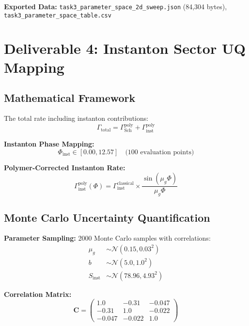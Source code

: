 \documentclass[11pt]{article}
\begin{document}
\textbf{Exported Data:} \texttt{task3\_parameter\_space\_2d\_sweep.json} (84,304 bytes), \texttt{task3\_parameter\_space\_table.csv}

\section{Deliverable 4: Instanton Sector UQ Mapping}

\subsection{Mathematical Framework}

The total rate including instanton contributions:
\begin{equation}
\boxed{\Gamma_{\text{total}} = \Gamma_{\text{Sch}}^{\text{poly}} + \Gamma_{\text{inst}}^{\text{poly}}}
\end{equation}

\textbf{Instanton Phase Mapping:}
\begin{equation}
\Phi_{\text{inst}} \in [0.00, 12.57] \quad \text{(100 evaluation points)}
\end{equation}

\textbf{Polymer-Corrected Instanton Rate:}
\begin{equation}
\Gamma_{\text{inst}}^{\text{poly}}(\Phi) = \Gamma_{\text{inst}}^{\text{classical}} \times \frac{\sin(\mu_g \Phi)}{\mu_g \Phi}
\end{equation}

\subsection{Monte Carlo Uncertainty Quantification}

\textbf{Parameter Sampling:} 2000 Monte Carlo samples with correlations:
\begin{align}
\mu_g &\sim \mathcal{N}(0.15, 0.03^2) \\
b &\sim \mathcal{N}(5.0, 1.0^2) \\
S_{\text{inst}} &\sim \mathcal{N}(78.96, 4.93^2)
\end{align}

\textbf{Correlation Matrix:}
\begin{equation}
\mathbf{C} = \begin{pmatrix}
1.0 & -0.31 & -0.047 \\
-0.31 & 1.0 & -0.022 \\
-0.047 & -0.022 & 1.0
\end{pmatrix}
\end{equation}
\end{document}
